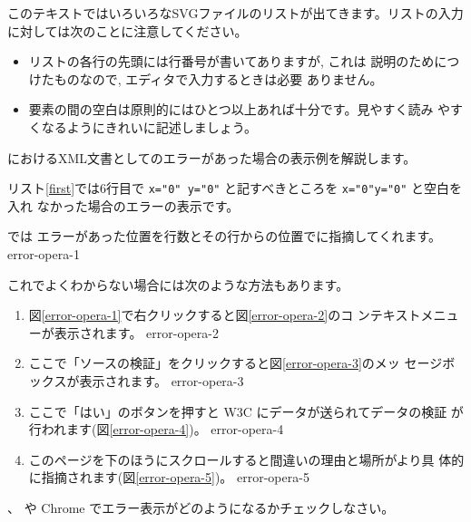 このテキストではいろいろなSVGファイルのリストが出てきます。リストの入力
に対しては次のことに注意してください。
\begin{itemize}
 \item リストの各行の先頭には行番号が書いてありますが, これは
       説明のためにつけたものなので, エディタで入力するときは必要
       ありません。
 \item 要素の間の空白は原則的にはひとつ以上あれば十分です。見やすく読み
       やすくなるようにきれいに記述しましょう。
\end{itemize}

\Opera におけるXML文書としてのエラーがあった場合の表示例を解説します。

リスト\ref{first}では6行目で
\texttt{x="0" y="0"} と記すべきところを \texttt{x="0"y="0"} と空白を入れ
       なかった場合のエラーの表示です。

\Opera{} では
エラーがあった位置を行数とその行からの位置でに指摘してくれます。
{error-opera-1}

これでよくわからない場合には次のような方法もあります。
\begin{enumerate}
 \item 図\ref{error-opera-1}で右クリックすると図\ref{error-opera-2}のコ
       ンテキストメニューが表示されます。
{error-opera-2}
 \item ここで「ソースの検証」をクリックすると図\ref{error-opera-3}のメッ
       セージボックスが表示されます。
{error-opera-3}
 \item ここで「はい」のボタンを押すと W3C にデータが送られてデータの検証
       が行われます(図\ref{error-opera-4})。
{error-opera-4}
 \item このページを下のほうにスクロールすると間違いの理由と場所がより具
       体的に指摘されます(図\ref{error-opera-5})。
{error-opera-5}
\end{enumerate}
\begin{Problem}\upshape
 \IEn、 \FFn や Chrome でエラー表示がどのようになるかチェックしなさい。
\end{Problem}







